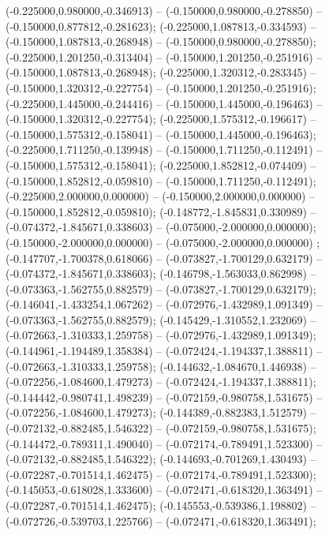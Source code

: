  (-0.225000,0.980000,-0.346913) -- (-0.150000,0.980000,-0.278850) -- (-0.150000,0.877812,-0.281623);
 (-0.225000,1.087813,-0.334593) -- (-0.150000,1.087813,-0.268948) -- (-0.150000,0.980000,-0.278850);
 (-0.225000,1.201250,-0.313404) -- (-0.150000,1.201250,-0.251916) -- (-0.150000,1.087813,-0.268948);
 (-0.225000,1.320312,-0.283345) -- (-0.150000,1.320312,-0.227754) -- (-0.150000,1.201250,-0.251916);
 (-0.225000,1.445000,-0.244416) -- (-0.150000,1.445000,-0.196463) -- (-0.150000,1.320312,-0.227754);
 (-0.225000,1.575312,-0.196617) -- (-0.150000,1.575312,-0.158041) -- (-0.150000,1.445000,-0.196463);
 (-0.225000,1.711250,-0.139948) -- (-0.150000,1.711250,-0.112491) -- (-0.150000,1.575312,-0.158041);
 (-0.225000,1.852812,-0.074409) -- (-0.150000,1.852812,-0.059810) -- (-0.150000,1.711250,-0.112491);
 (-0.225000,2.000000,0.000000) -- (-0.150000,2.000000,0.000000) -- (-0.150000,1.852812,-0.059810);
 (-0.148772,-1.845831,0.330989) -- (-0.074372,-1.845671,0.338603) -- (-0.075000,-2.000000,0.000000);
 (-0.150000,-2.000000,0.000000) -- (-0.075000,-2.000000,0.000000) ;
 (-0.147707,-1.700378,0.618066) -- (-0.073827,-1.700129,0.632179) -- (-0.074372,-1.845671,0.338603);
 (-0.146798,-1.563033,0.862998) -- (-0.073363,-1.562755,0.882579) -- (-0.073827,-1.700129,0.632179);
 (-0.146041,-1.433254,1.067262) -- (-0.072976,-1.432989,1.091349) -- (-0.073363,-1.562755,0.882579);
 (-0.145429,-1.310552,1.232069) -- (-0.072663,-1.310333,1.259758) -- (-0.072976,-1.432989,1.091349);
 (-0.144961,-1.194489,1.358384) -- (-0.072424,-1.194337,1.388811) -- (-0.072663,-1.310333,1.259758);
 (-0.144632,-1.084670,1.446938) -- (-0.072256,-1.084600,1.479273) -- (-0.072424,-1.194337,1.388811);
 (-0.144442,-0.980741,1.498239) -- (-0.072159,-0.980758,1.531675) -- (-0.072256,-1.084600,1.479273);
 (-0.144389,-0.882383,1.512579) -- (-0.072132,-0.882485,1.546322) -- (-0.072159,-0.980758,1.531675);
 (-0.144472,-0.789311,1.490040) -- (-0.072174,-0.789491,1.523300) -- (-0.072132,-0.882485,1.546322);
 (-0.144693,-0.701269,1.430493) -- (-0.072287,-0.701514,1.462475) -- (-0.072174,-0.789491,1.523300);
 (-0.145053,-0.618028,1.333600) -- (-0.072471,-0.618320,1.363491) -- (-0.072287,-0.701514,1.462475);
 (-0.145553,-0.539386,1.198802) -- (-0.072726,-0.539703,1.225766) -- (-0.072471,-0.618320,1.363491);

